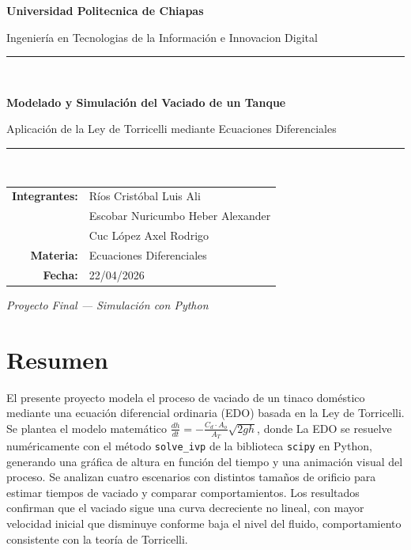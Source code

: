 \documentclass[12pt, a4paper]{article}
\begin{document}
\begin{titlepage}
    \centering
    \vspace*{2cm}
    {\Large \textbf{Universidad Politecnica de Chiapas} \par}
    \vspace{0.5cm}
    {\large Ingeniería en Tecnologias de la Información e Innovacion Digital \par}
    \vspace{2cm}
    \rule{\linewidth}{0.5mm} \\[0.4cm]
    {\LARGE \textbf{Modelado y Simulación del Vaciado de un Tanque} \par}
    {\large Aplicación de la Ley de Torricelli mediante Ecuaciones Diferenciales \par}
    \rule{\linewidth}{0.5mm} \\[1.5cm]

    \begin{tabular}{rl}
        \textbf{Integrantes:} & R\'ios Crist\'obal Luis Ali \\[5pt]
        & Escobar Nuricumbo Heber Alexander \\[5pt]
        & Cuc L\'opez Axel Rodrigo \\[5pt]
        \textbf{Materia:}   & Ecuaciones Diferenciales \\[4pt]
        \textbf{Fecha:}     & 22/04/2026 \\
    \end{tabular}

    \vfill
    {\large \textit{Proyecto Final — Simulación con Python} \par}
\end{titlepage}

\tableofcontents
\newpage

\section{Resumen}

El presente proyecto modela el proceso de vaciado de un tinaco doméstico mediante
una ecuación diferencial ordinaria (EDO) basada en la Ley de Torricelli. Se plantea
el modelo matemático $\frac{dh}{dt} = -\frac{C_d \cdot A_o}{A_T}\sqrt{2gh}$, donde La EDO se resuelve numéricamente con el método
\texttt{solve\_ivp} de la biblioteca \texttt{scipy} en Python, generando una
gráfica de altura en función del tiempo y una animación visual del proceso.
Se analizan cuatro escenarios con distintos tamaños de orificio para estimar
tiempos de vaciado y comparar comportamientos. Los resultados confirman que
el vaciado sigue una curva decreciente no lineal, con mayor velocidad inicial
que disminuye conforme baja el nivel del fluido, comportamiento consistente
con la teoría de Torricelli.
\end{document}
